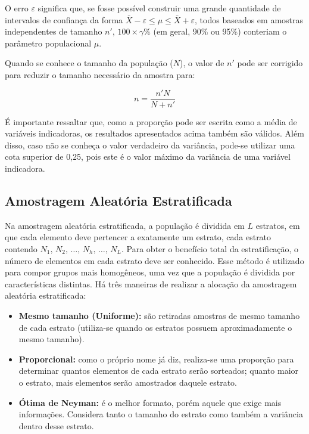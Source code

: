 \documentclass[
]{estat/estat}
\providecommand{\tightlist}{%
  \setlength{\itemsep}{0pt}\setlength{\parskip}{0pt}}\usepackage{longtable,booktabs,array}
\begin{document}
O erro \(\varepsilon\) significa que, se fosse possível construir uma
grande quantidade de intervalos de confiança da forma
\(\bar{X} - \varepsilon \leq \mu \leq \bar{X} + \varepsilon\), todos
baseados em amostras independentes de tamanho \(n'\),
\(100 \times \gamma\%\) (em geral, 90\% ou 95\%) conteriam o parâmetro
populacional \(\mu\).

Quando se conhece o tamanho da população (\(N\)), o valor de \(n'\) pode
ser corrigido para reduzir o tamanho necessário da amostra para:

\[
n = \frac{n'N}{N+n'}
\]

É importante ressaltar que, como a proporção pode ser escrita como a
média de variáveis indicadoras, os resultados apresentados acima também
são válidos. Além disso, caso não se conheça o valor verdadeiro da
variância, pode-se utilizar uma cota superior de 0,25, pois este é o
valor máximo da variância de uma variável indicadora.

\subsection{Amostragem Aleatória
Estratificada}\label{amostragem-aleatuxf3ria-estratificada}

Na amostragem aleatória estratificada, a população é dividida em \(L\)
estratos, em que cada elemento deve pertencer a exatamente um estrato,
cada estrato contendo
\(N_1, \, N_2, \, \ldots, \, N_h, \, \ldots, \, N_L\). Para obter o
benefício total da estratificação, o número de elementos em cada estrato
deve ser conhecido. Esse método é utilizado para compor grupos mais
homogêneos, uma vez que a população é dividida por características
distintas. Há três maneiras de realizar a alocação da amostragem
aleatória estratificada:

\begin{itemize}
\tightlist
\item
  \textbf{Mesmo tamanho (Uniforme):} são retiradas amostras de mesmo
  tamanho de cada estrato (utiliza-se quando os estratos possuem
  aproximadamente o mesmo tamanho).
\item
  \textbf{Proporcional:} como o próprio nome já diz, realiza-se uma
  proporção para determinar quantos elementos de cada estrato serão
  sorteados; quanto maior o estrato, mais elementos serão amostrados
  daquele estrato.
\item
  \textbf{Ótima de Neyman:} é o melhor formato, porém aquele que exige
  mais informações. Considera tanto o tamanho do estrato como também a
  variância dentro desse estrato.
\end{itemize}
\end{document}
